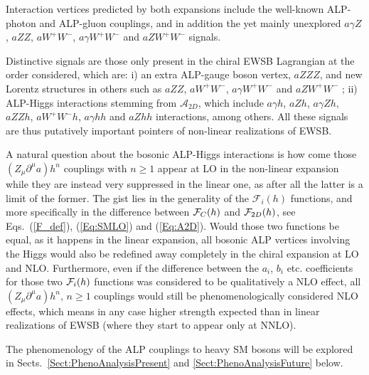 \documentclass[11pt]{article}
\newcommand{\A}{\mathcal{A}}
\newcommand{\F}{\mathcal{F}}
\newcommand{\de}{\partial}
\renewcommand{\[}{\begin{equation}}
\renewcommand{\]}{\end{equation}}
\def\cF{{\cal F}}
\begin{document}
 Interaction vertices predicted by both expansions include the well-known ALP-photon and ALP-gluon couplings, and in addition the yet mainly unexplored $a\gamma Z$, $aZZ$,  $aW^+W^-$, $a\gamma W^+W^-$ and $aZW^+W^-$ signals. 
 
 Distinctive signals are those only present in the chiral EWSB Lagrangian at the order considered, which are:  i)  an extra ALP-gauge boson vertex, $aZZZ$, and new Lorentz structures in others such as $aZZ$, $aW^+W^-$, $a\gamma W^+W^-$  and $aZW^+W^-$  ; ii)  ALP-Higgs interactions stemming from $\A_{2D}$, which include $a\gamma h$, $aZh$, $a\gamma Zh$, $aZZh$, $aW^+W^-h$, $a\gamma h h$ and  $aZh h$ interactions,  among others.  All these signals are thus putatively important pointers of non-linear realizations of EWSB. 


A natural question about the bosonic ALP-Higgs interactions is how come those $(Z_\mu \de^\mu a) h^n$ couplings with $n\geq 1$  appear at LO in the  non-linear expansion while they are instead very suppressed in the linear one, as after all the latter is a limit of the former. The gist lies in the generality of the $\F_i(h)$ functions, and more specifically in the difference between $\cF_C(h)$ and $\cF_{2D}(h)$, see Eqs.~(\ref{F_def}),    
 (\ref{Eq:SMLO}) and (\ref{Eq:A2D}). Would those two functions be equal, as it happens in the linear expansion, all bosonic ALP vertices involving the Higgs would also be redefined away completely  in the chiral expansion at LO and NLO. Furthermore, even if  the difference between the $a_i$, $b_i$ etc.  coefficients for those two $\cF_i(h)$ functions was considered to be qualitatively  a NLO effect, all $(Z_\mu \de^\mu a) h^n,\, n\geq 1$ couplings would still be phenomenologically considered NLO effects, which means in any case higher strength expected than in linear realizations of EWSB (where they start to appear only at NNLO). 

The phenomenology of the ALP couplings to heavy SM bosons will be explored in  Sects.~\ref{Sect:PhenoAnalysisPresent} and \ref{Sect:PhenoAnalysisFuture}  below.




 
 
\end{document}
